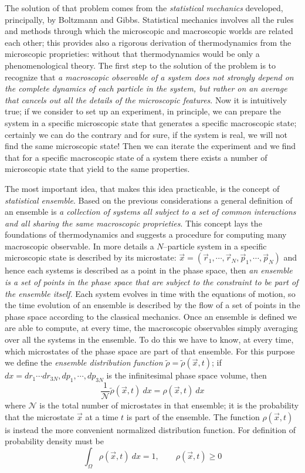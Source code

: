 The solution of that problem comes from the \textit{statistical mechanics} developed, principally, by Boltzmann and Gibbs. Statistical mechanics involves all the rules and methods through which the microscopic and macroscopic worlds are related each other; this provides also a rigorous derivation of thermodynamics from the microscopic proprieties:
without that thermodynamics would be only a phenomenological theory. The first step to the solution of the problem is to recognize that \textit{a macroscopic observable of a system does not strongly depend on the complete dynamics of each particle in the system, but rather on an average that cancels out all the details of the microscopic features}.
Now it is intuitively true; if we consider to set up an experiment, in principle, we can prepare the system in a specific microscopic state that generates a specific macroscopic state; certainly we can do the contrary and for sure, if the system is real, we will not find the same microscopic state! Then we can iterate the experiment and we find that for a specific macroscopic state of a system there exists a number of microscopic state that yield to the same properties.

The most important idea, that makes this idea practicable, is the concept of \textit{statistical ensemble}.
Based on the previous considerations a general definition of an ensemble is \textit{a collection of systems all subject to a set of common interactions and all sharing the same macroscopic proprieties}. This concept lays the foundations of thermodynamics and suggests a procedure for computing many macroscopic observable. In more details a $N$--particle system in a specific microscopic state is described by its microstate: $\vec x = (\vec r_1,\cdots,\vec r_N, \vec p_1, \cdots, \vec p_N)$ and hence each systems is described as a point in the phase space, then \textit{an ensemble is a set of points in the phase space that are subject to the constraint to be part of the ensemble itself}.
Each system evolves in time with the equations of motion, so the time evolution of an ensemble is described by the flow of a set of points in the phase space according to the classical mechanics. Once an ensemble is defined we are able to compute, at every time, the macroscopic observables simply averaging over all the systems in the ensemble.
To do this we have to know, at every time, which microstates of the phase space are part of that ensemble.
For this purpose we define the \textit{ensemble distribution function} $\tilde\rho = \tilde\rho(\vec x,t)$; if $dx = dr_1\cdots dr_{3N}, dp_1, \cdots,dp_{3N}$ is the infinitesimal phase space volume, then
\begin{equation*}
	\frac{1}{\mathcal{N}}\tilde\rho(\vec x, t)\ dx = \rho(\vec x, t)\ dx
\end{equation*}
where $\mathcal{N}$ is the total number of microstates in that ensemble; it is the probability that the microstate $\vec x$ at a time $t$ is part of the ensemble. The function $\rho(\vec x, t)$ is instead the more convenient normalized distribution function. For definition of probability density must be
\begin{equation*}
		\int_{\Omega} \rho(\vec x, t)\ dx = 1, \qquad \rho(\vec x, t) \ge 0
\end{equation*}

